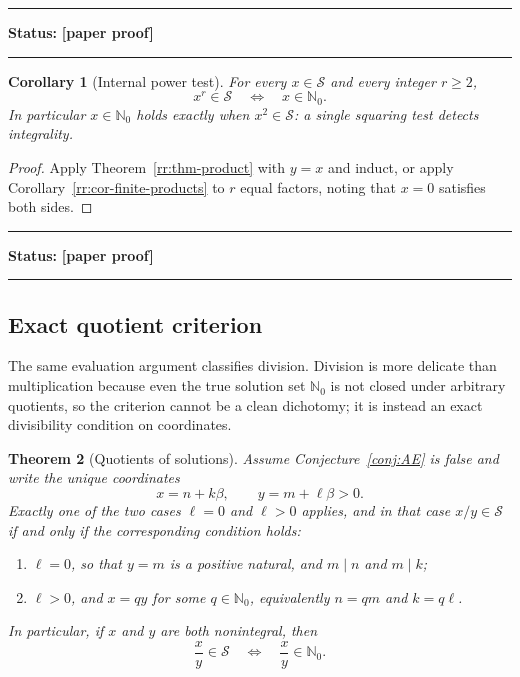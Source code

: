 \documentclass[11pt,oneside]{article}
\newtheorem{theorem}{Theorem}[section]
\newtheorem{corollary}[theorem]{Corollary}
\theoremstyle{definition}
\theoremstyle{remark}
\newcommand{\Nzero}{\mathbb N_0}
\newcommand{\Sol}{\mathcal S}
\newcommand{\statusnew}{\textcolor{newgreen}{\textbf{[paper proof]}}}
\newenvironment{statusbox}[1]
{\begin{center}\begin{minipage}{0.94\textwidth}\raggedright\hbadness=10000\hrule
\vspace{0.45em}\textbf{Status:} #1\par\vspace{0.35em}}
{\vspace{0.35em}\hrule\end{minipage}\end{center}}
\begin{document}
\begin{statusbox}{\statusnew}
\end{statusbox}

\begin{corollary}[Internal power test]
\label{rr:cor-power-test}
For every $x\in\Sol$ and every integer $r\ge2$,
\[
 x^r\in\Sol
 \quad\Longleftrightarrow\quad
 x\in\Nzero .
\]
In particular $x\in\Nzero$ holds exactly when $x^2\in\Sol$: a single squaring test detects
integrality.
\end{corollary}

\begin{proof}
Apply Theorem~\ref{rr:thm-product} with $y=x$ and induct, or apply
Corollary~\ref{rr:cor-finite-products} to $r$ equal factors, noting that $x=0$ satisfies both
sides.
\end{proof}

\begin{statusbox}{\statusnew}
\end{statusbox}

\subsection{Exact quotient criterion}

The same evaluation argument classifies division.  Division is more delicate than
multiplication because even the true solution set $\Nzero$ is not closed under arbitrary
quotients, so the criterion cannot be a clean dichotomy; it is instead an exact divisibility
condition on coordinates.

\begin{theorem}[Quotients of solutions]
\label{rr:thm-quotient}
Assume Conjecture~\ref{conj:AE} is false and write the unique coordinates
\[
 x=n+k\beta,
 \qquad
 y=m+\ell\beta>0 .
\]
Exactly one of the two cases $\ell=0$ and $\ell>0$ applies, and in that case
$x/y\in\Sol$ if and only if the corresponding condition holds:
\begin{enumerate}[label=\textup{(\alph*)}]
\item $\ell=0$, so that $y=m$ is a positive natural, and $m\mid n$ and $m\mid k$;
\item $\ell>0$, and $x=qy$ for some $q\in\Nzero$, equivalently $n=qm$ and $k=q\ell$.
\end{enumerate}
In particular, if $x$ and $y$ are both nonintegral, then
\[
 \frac{x}{y}\in\Sol
 \quad\Longleftrightarrow\quad
 \frac{x}{y}\in\Nzero .
\]
\end{theorem}
\end{document}
